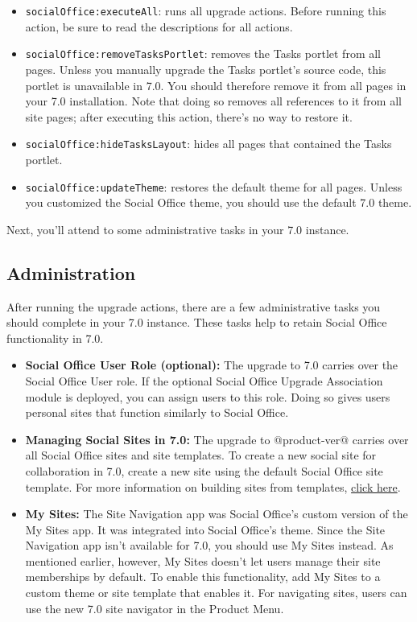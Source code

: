 \begin{itemize}
\item
  \texttt{socialOffice:executeAll}: runs all upgrade actions. Before
  running this action, be sure to read the descriptions for all actions.
\item
  \texttt{socialOffice:removeTasksPortlet}: removes the Tasks portlet
  from all pages. Unless you manually upgrade the Tasks portlet's source
  code, this portlet is unavailable in 7.0. You should therefore remove
  it from all pages in your 7.0 installation. Note that doing so removes
  all references to it from all site pages; after executing this action,
  there's no way to restore it.
\item
  \texttt{socialOffice:hideTasksLayout}: hides all pages that contained
  the Tasks portlet.
\item
  \texttt{socialOffice:updateTheme}: restores the default theme for all
  pages. Unless you customized the Social Office theme, you should use
  the default 7.0 theme.
\end{itemize}

Next, you'll attend to some administrative tasks in your 7.0 instance.

\subsection{Administration}\label{administration}

After running the upgrade actions, there are a few administrative tasks
you should complete in your 7.0 instance. These tasks help to retain
Social Office functionality in 7.0.

\begin{itemize}
\item
  \textbf{Social Office User Role (optional):} The upgrade to 7.0
  carries over the Social Office User role. If the optional Social
  Office Upgrade Association module is deployed, you can assign users to
  this role. Doing so gives users personal sites that function similarly
  to Social Office.
\item
  \textbf{Managing Social Sites in 7.0:} The upgrade to @product-ver@
  carries over all Social Office sites and site templates. To create a
  new social site for collaboration in 7.0, create a new site using the
  default Social Office site template. For more information on building
  sites from templates,
  \href{/docs/7-0/user/-/knowledge_base/u/building-sites-from-templates}{click
  here}.
\item
  \textbf{My Sites:} The Site Navigation app was Social Office's custom
  version of the My Sites app. It was integrated into Social Office's
  theme. Since the Site Navigation app isn't available for 7.0, you
  should use My Sites instead. As mentioned earlier, however, My Sites
  doesn't let users manage their site memberships by default. To enable
  this functionality, add My Sites to a custom theme or site template
  that enables it. For navigating sites, users can use the new 7.0 site
  navigator in the Product Menu.
\end{itemize}

